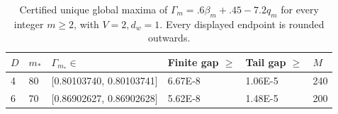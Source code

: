 \begin{table}[htbp]
\centering
\caption{Certified unique global maxima of $\Gamma_m=.6\beta_m+.45-7.2q_m$ for every integer $m\geq2$, with $V=2,d_w=1$. Every displayed endpoint is rounded outwards.}
\label{tab:coupled_optima}
\begin{tabular}{llllll}
\toprule
$D$ & $m_*$ & $\Gamma_{m_*}\in$ & Finite gap $\geq$ & Tail gap $\geq$ & $M$ \\
\midrule
4 & 80 & [0.80103740, 0.80103741] & 6.67E-8 & 1.06E-5 & 240 \\
6 & 70 & [0.86902627, 0.86902628] & 5.62E-8 & 1.48E-5 & 200 \\
\bottomrule
\end{tabular}
\end{table}
